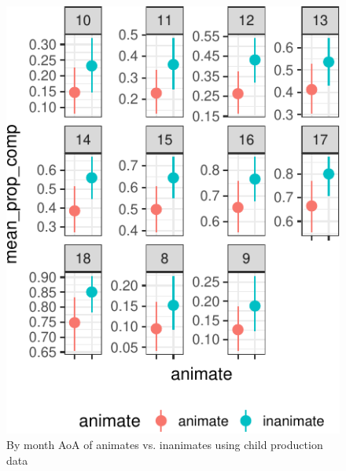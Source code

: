 \documentclass[10pt, letterpaper]{article}
\newenvironment{CodeChunk}{}{}
\begin{document}
\begin{CodeChunk}
\begin{figure}[tb]
\includegraphics{figs/animacy-aoa-comp-1} \caption[By month AoA of animates vs]{By month AoA of animates vs. inanimates using child production data}\label{fig:animacy-aoa-comp}
\end{figure}
\end{CodeChunk}
\end{document}
